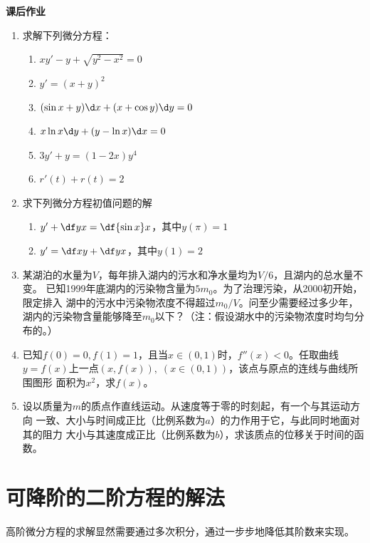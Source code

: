\begin{ext}
	{\bf 课后作业}
	
	\begin{enumerate}
	  \item 求解下列微分方程：
	  \begin{enumerate}[(1)]
	    \item $xy'-y+\sqrt{y^2-x^2}=0$
	    \item $y'=(x+y)^2$
	    \item $(\sin x+y)\d x+(x+\cos y)\d y=0$
	    \item $x\ln x\d y+(y-\ln x)\d x=0$ 
	    \item $3y'+y=(1-2x)y^4$
	    \item $r'(t)+r(t)=2$
	  \end{enumerate}
	  \item 求下列微分方程初值问题的解
	  \begin{enumerate}[(1)]
	    \item $y'+\df yx=\df{\sin x}x$，其中$y(\pi)=1$
	    \item $y'=\df xy+\df yx$，其中$y(1)=2$
	  \end{enumerate}
	  \item 某湖泊的水量为$V$，每年排入湖内的污水和净水量均为$V/6$，且湖内的总水量不变。
	  已知1999年底湖内的污染物含量为$5m_0$。为了治理污染，从2000初开始，限定排入
	  湖中的污水中污染物浓度不得超过$m_0/V$。问至少需要经过多少年，
	  湖内的污染物含量能够降至$m_0$以下？（注：假设湖水中的污染物浓度时均匀分布的。）
	  \item 已知$f(0)=0,f(1)=1$，且当$x\in(0,1)$时，$f''(x)<0$。任取曲线
	  $y=f(x)$上一点$(x,f(x)),\;(x\in(0,1))$，该点与原点的连线与曲线所围图形
	  面积为$x^2$，求$f(x)$。
	  \item 设以质量为$m$的质点作直线运动。从速度等于零的时刻起，有一个与其运动方向
	  一致、大小与时间成正比（比例系数为$a$）的力作用于它，与此同时地面对其的阻力
	  大小与其速度成正比（比例系数为$b$），求该质点的位移关于时间的函数。
	\end{enumerate}
\end{ext}

\section{可降阶的二阶方程的解法}

高阶微分方程的求解显然需要通过多次积分，通过一步步地降低其阶数来实现。

